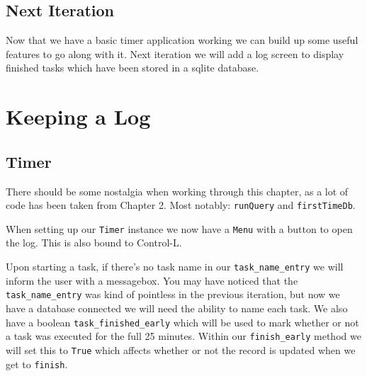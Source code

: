\documentclass[a4paper,11pt,openany]{book}
\begin{document}
\subsection{Next Iteration}

Now that we have a basic timer application working we can build up some useful features to go along with it. Next iteration we will add a log screen to display finished tasks which have been stored in a sqlite database. 

\newpage

\section{Keeping a Log}



\subsection{Timer}

There should be some nostalgia when working through this chapter, as a lot of code has been taken from Chapter 2. Most notably: \lstinline[columns=fixed]{runQuery} and \lstinline[columns=fixed]{firstTimeDb}. 

\vspace{5mm}

When setting up our \lstinline[columns=fixed]{Timer} instance we now have a \lstinline[columns=fixed]{Menu} with a button to open the log. This is also bound to Control-L. 

\vspace{5mm}

Upon starting a task, if there's no task name in our \lstinline[columns=fixed]{task_name_entry} we will inform the user with a messagebox. You may have noticed that the \lstinline[columns=fixed]{task_name_entry} was kind of pointless in the previous iteration, but now we have a database connected we will need the ability to name each task. We also have a boolean \lstinline[columns=fixed]{task_finished_early} which will be used to mark whether or not a task was executed for the full 25 minutes. Within our \lstinline[columns=fixed]{finish_early} method we will set this to \lstinline[columns=fixed]{True} which affects whether or not the record is updated when we get to \lstinline[columns=fixed]{finish}. 

\vspace{5mm}
\end{document}
